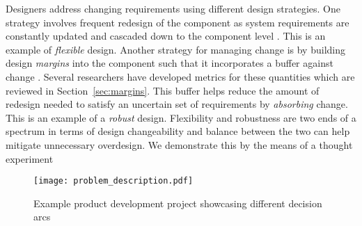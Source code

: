 Designers address changing requirements using different design strategies. One strategy involves frequent redesign of the component as system requirements are constantly updated and cascaded down to the component level \cite{Eckert2004}. This is an example of \textit{flexible} design. Another strategy for managing change is by building design \textit{margins} into the component such that it incorporates a buffer against change \cite{Clarkson2004,Eckert2004}. Several researchers have developed metrics for these quantities which are reviewed in Section~\ref{sec:margins}. This buffer helps reduce the amount of redesign needed to satisfy an uncertain set of requirements by \textit{absorbing} change. This is an example of a \textit{robust} design. Flexibility and robustness are two ends of a spectrum in terms of design changeability and balance between the two can help mitigate unnecessary overdesign. We demonstrate this by the means of a thought experiment

\begin{figure}[h!]
	\centering
	\texttt{[image: problem\_description.pdf]}
	\caption{Example product development project showcasing different decision arcs}
	\label{fig:problemdescription}
\end{figure}

